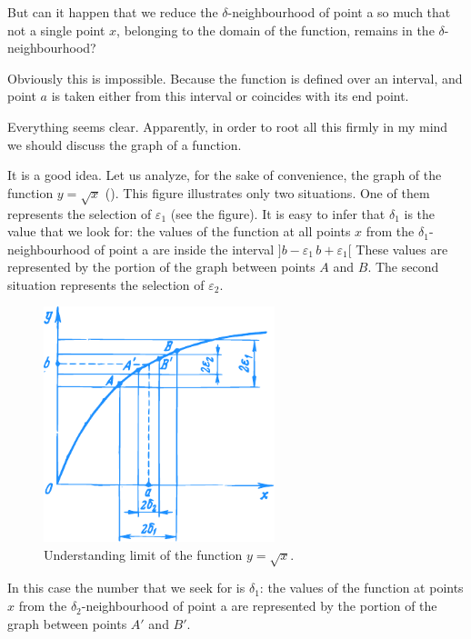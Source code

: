 {\rdr But can it happen that we reduce the $\delta$-neighbourhood of point a so much that not a single point $x$, belonging to the domain of the function, remains in the $\delta$-neighbourhood?

\athr Obviously this is impossible. Because the function is defined over an interval, and point $a$ is taken either from this interval or coincides with its end point.

\rdr Everything seems clear. Apparently, in order to root all this firmly in my mind we should discuss the graph of a function.


\athr It is a good idea. Let us analyze, for the sake of convenience, the graph of the function $y = \sqrt{x}$ (). This figure illustrates only two situations. One of them represents the selection of $\varepsilon_{1}$ (see the figure). It is easy to infer that $\delta_{1}$	is the value that we look for: the values of the function at all points $x$ from the $\delta_{1}$-neighbourhood of point a
are inside the interval $]b -\varepsilon_{1} 	\, b + \varepsilon_{1} [$ These values are represented by the portion of the graph between points $A$ and $B$. The second situation represents the selection of $\varepsilon_{2}$.

\begin{figure}[!ht]%
\centering
\includegraphics[width=0.6\textwidth]{figures/fig-25.pdf}
\caption{Understanding limit of the function $y = \sqrt{x}$.}
\label{fig-25}
\end{figure}

In this case the number that we seek for is $\delta_{1}$: the values of the function at points $x$ from the $\delta_{2}$-neighbourhood of point a are represented by the portion of the graph between points $A'$ and $B'$.

}
